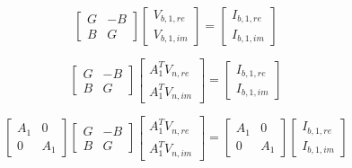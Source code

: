\documentclass{book}
\begin{document}
\begin{equation}
\begin{bmatrix}
G&-B\\
B&G
\end{bmatrix}
\begin{bmatrix}
V_{b,1,re}\\
V_{b,1,im}
\end{bmatrix}
=
\begin{bmatrix}
I_{b,1,re}\\
I_{b,1,im}
\end{bmatrix}
\end{equation}

\begin{equation}
\begin{bmatrix}
G&-B\\
B&G
\end{bmatrix}
\begin{bmatrix}
A_{1}^{T}V_{n,re}\\
A_{1}^{T}V_{n,im}
\end{bmatrix}
=
\begin{bmatrix}
I_{b,1,re}\\
I_{b,1,im}
\end{bmatrix}
\end{equation}


\begin{equation}
\begin{bmatrix}
A_1&0\\
0&A_1
\end{bmatrix}
\begin{bmatrix}
G&-B\\
B&G
\end{bmatrix}
\begin{bmatrix}
A_{1}^{T}V_{n,re}\\
A_{1}^{T}V_{n,im}
\end{bmatrix}
=
\begin{bmatrix}
A_1&0\\
0&A_1
\end{bmatrix}
\begin{bmatrix}
I_{b,1,re}\\
I_{b,1,im}
\end{bmatrix}
\end{equation}
\end{document}
